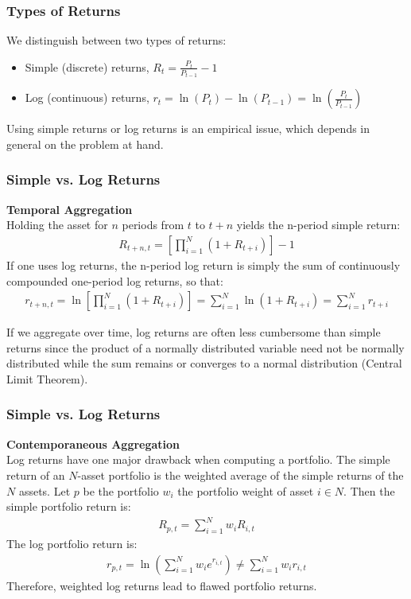 \documentclass[xcolor=dvipsnames, english, 8pt]{beamer}
\begin{document}
\begin{frame}
    \frametitle{Types of Returns}
We distinguish between two types of returns: \vspace{0.25cm}\\
\begin{itemize}
    \item Simple (discrete) returns, $R_t = \frac{P_{t}}{P_{t-1}}-1$
    \item Log (continuous) returns, $r_t = \ln(P_t) - \ln(P_{t-1}) = \ln(\frac{P_{t}}{P_{t-1}})$ \vspace{0.25cm}\\
\end{itemize}
Using simple returns or log returns is an empirical issue, which depends in general on
the problem at hand.
\end{frame}

\begin{frame}
    \frametitle{ Simple vs. Log Returns}
    \textbf{Temporal Aggregation}\vspace{0.5cm}\\

    Holding the asset for $n$ periods from $t$ to $t + n$ yields the n-period simple return:
    \begin{align}
        R_{t+n,t} = \left[\prod\limits_{i=1}^N (1+R_{t+i})\right]-1
    \end{align}
    If one uses log returns, the n-period log return is simply the sum of continuously
    compounded one-period log returns, so that:
    \begin{align}
        r_{t+n,t} = \ln\left[\prod\limits_{i=1}^N (1+R_{t+i})\right] = \sum\limits_{i=1}^N \ln(1+R_{t+i}) = \sum\limits_{i=1}^N r_{t+i}
    \end{align}

If we aggregate over time, log returns are often less cumbersome than simple returns since the product of a normally distributed variable need not be normally distributed while the sum remains or converges to a normal distribution (Central Limit Theorem).

\end{frame}

\begin{frame}
    \frametitle{ Simple vs. Log Returns}
    \textbf{Contemporaneous Aggregation}\vspace{0.5cm}\\
Log returns have one major drawback when computing a portfolio. The simple return of an $N$-asset portfolio is the weighted average of the simple returns of the $N$ assets. Let $p$ be the portfolio $w_i$ the portfolio weight of asset $i \in N$. Then the simple portfolio return is:
\begin{align}
    R_{p,t} = \sum\limits_{i=1}^N w_i R_{i,t}
\end{align}
The log portfolio return is:
\begin{align}
    r_{p,t} = \ln\left(\sum\limits_{i=1}^N w_i e^{r_{i,t}} \right)\neq \sum\limits_{i=1}^N w_i r_{i,t}
\end{align}
Therefore, weighted log returns lead to flawed portfolio returns.
\end{frame}
\end{document}
